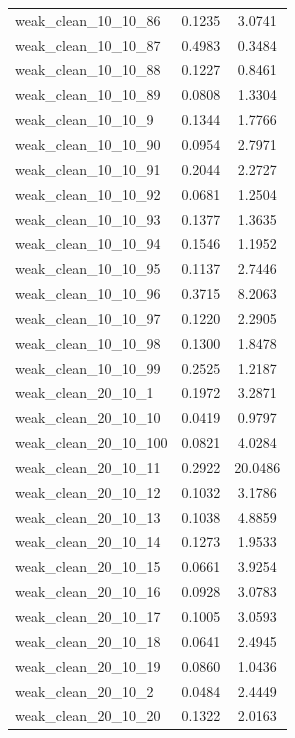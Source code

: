 \begin{longtable}{lcc}
weak\_clean\_10\_10\_86    &   0.1235 &  3.0741 \\
weak\_clean\_10\_10\_87    &   0.4983 &  0.3484 \\
weak\_clean\_10\_10\_88    &   0.1227 &  0.8461 \\
weak\_clean\_10\_10\_89    &   0.0808 &  1.3304 \\
weak\_clean\_10\_10\_9     &   0.1344 &  1.7766 \\
weak\_clean\_10\_10\_90    &   0.0954 &  2.7971 \\
weak\_clean\_10\_10\_91    &   0.2044 &  2.2727 \\
weak\_clean\_10\_10\_92    &   0.0681 &  1.2504 \\
weak\_clean\_10\_10\_93    &   0.1377 &  1.3635 \\
weak\_clean\_10\_10\_94    &   0.1546 &  1.1952 \\
weak\_clean\_10\_10\_95    &   0.1137 &  2.7446 \\
weak\_clean\_10\_10\_96    &   0.3715 &  8.2063 \\
weak\_clean\_10\_10\_97    &   0.1220 &  2.2905 \\
weak\_clean\_10\_10\_98    &   0.1300 &  1.8478 \\
weak\_clean\_10\_10\_99    &   0.2525 &  1.2187 \\
weak\_clean\_20\_10\_1     &   0.1972 &  3.2871 \\
weak\_clean\_20\_10\_10    &   0.0419 &  0.9797 \\
weak\_clean\_20\_10\_100   &   0.0821 &  4.0284 \\
weak\_clean\_20\_10\_11    &   0.2922 & 20.0486 \\
weak\_clean\_20\_10\_12    &   0.1032 &  3.1786 \\
weak\_clean\_20\_10\_13    &   0.1038 &  4.8859 \\
weak\_clean\_20\_10\_14    &   0.1273 &  1.9533 \\
weak\_clean\_20\_10\_15    &   0.0661 &  3.9254 \\
weak\_clean\_20\_10\_16    &   0.0928 &  3.0783 \\
weak\_clean\_20\_10\_17    &   0.1005 &  3.0593 \\
weak\_clean\_20\_10\_18    &   0.0641 &  2.4945 \\
weak\_clean\_20\_10\_19    &   0.0860 &  1.0436 \\
weak\_clean\_20\_10\_2     &   0.0484 &  2.4449 \\
weak\_clean\_20\_10\_20    &   0.1322 &  2.0163 \\

\end{longtable}
